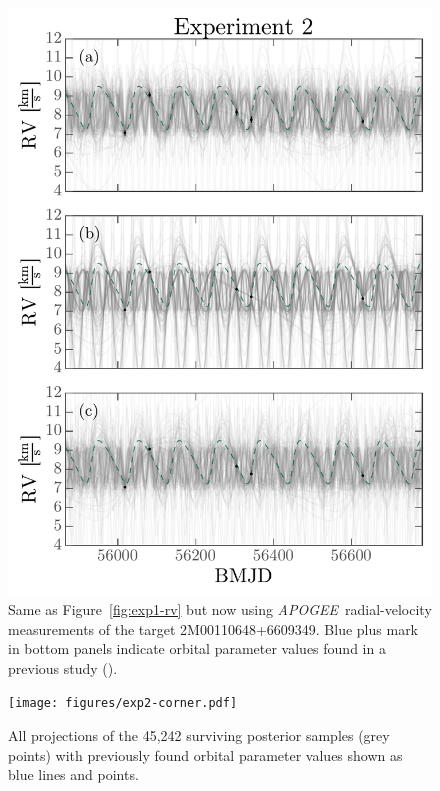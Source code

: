 \documentclass[manuscript, letterpaper]{aastex6}
\newcommand{\project}[1]{\textsl{#1}}
\newcommand{\acronym}[1]{{\small{#1}}}
\newcommand{\apogee}{\project{\acronym{APOGEE}}}
\newcommand{\figname}{Figure}
\begin{document}
\begin{figure}[p]
\begin{center}
\includegraphics[width=\textwidth]{figures/exp2-rv-curves.pdf}
\end{center}
\caption{%
Same as \figname~\ref{fig:exp1-rv} but now using \apogee\ radial-velocity
measurements of the target 2M00110648+6609349.
Blue plus mark in bottom panels indicate orbital parameter values found in a
previous study (\citealt{Troup:2016}).
\label{fig:exp2-rv}}
\end{figure}

\begin{figure}[p]
\begin{center}
\texttt{[image: figures/exp2-corner.pdf]}
\end{center}
\caption{%
All projections of the 45,242 surviving posterior samples (grey points) with
previously found orbital parameter values shown as blue lines and points.
\label{fig:exp2-corner}}
\end{figure}
\end{document}
